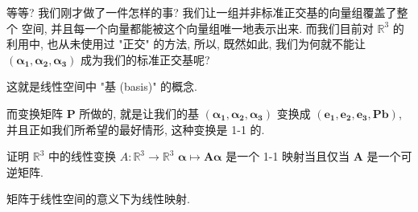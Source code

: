 \documentclass[UTF8]{book}
\begin{document}
    等等? 我们刚才做了一件怎样的事? 我们让一组并非标准正交基的向量组覆盖了整个
    空间, 并且每一个向量都能被这个向量组唯一地表示出来. 
    而我们目前对 $\mathbb{R}^3$ 的利用中, 也从未使用过 "正交" 的方法, 
    所以, 既然如此, 我们为何就不能让 $(\boldsymbol{\alpha_1},
    \boldsymbol{\alpha_2},\boldsymbol{\alpha_3})$ 成为我们的标准正交基呢? 
    
    这就是线性空间中 "基 (basis)" 的概念.  

    而变换矩阵 $\boldsymbol{P}$ 所做的, 就是让我们的基 
    $(\boldsymbol{\alpha_1},
    \boldsymbol{\alpha_2},\boldsymbol{\alpha_3})$ 
    变换成 $ (\boldsymbol{e_1},\boldsymbol{e_2},\boldsymbol{e_3},
    \boldsymbol{P}\boldsymbol{b})$, 
    并且正如我们所希望的最好情形, 这种变换是 1-1 的. 

    \begin{exercise}
        证明 $\mathbb{R}^3 $ 中的线性变换 
        $ A: \mathbb{R}^3 \to \mathbb{R}^3 $ 
        $\boldsymbol{\alpha} \mapsto \boldsymbol{A}\boldsymbol{\alpha} $ 
        是一个 1-1 映射当且仅当 $\boldsymbol{A}$ 是一个可逆矩阵.
    \end{exercise}

    矩阵于线性空间的意义下为线性映射. 
\end{document}
